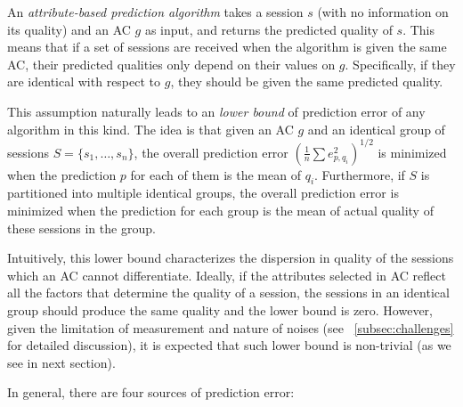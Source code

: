 An {\it attribute-based prediction algorithm} takes a session $s$ (with no information on its quality) and an AC $g$ as input, and returns the predicted quality of $s$. This means that if a set of sessions are received when the algorithm is given the same AC, their predicted qualities only depend on their values on $g$. Specifically, if they are identical with respect to $g$, they should be given the same predicted quality. 


This assumption naturally leads to an {\it lower bound} of prediction error of any algorithm in this kind. 
The idea is that given an AC $g$ and an identical group of sessions $S=\{s_1,\dots,s_n\}$, the overall prediction error $\left(\frac{1}{n}\sum e_{p,q_i}^2\right)^{1/2}$ is minimized when the prediction $p$ for each of them is the mean of $q_i$. Furthermore, if $S$ is partitioned into multiple identical groups,  the overall prediction error is minimized when the prediction for each group is the mean of actual quality of these sessions in the group. 

Intuitively, this lower bound characterizes the dispersion in quality of the sessions which an AC cannot differentiate. Ideally, if the attributes selected in AC reflect all the factors that determine the quality of a session, the sessions in an identical group should produce the same quality and the lower bound is zero. However, given the limitation of measurement and nature of noises (see \Section~\ref{subsec:challenges} for detailed discussion), it is expected that such lower bound is non-trivial (as we see in next section).


\label{subsec:challenges}

In general, there are four sources of prediction error:

